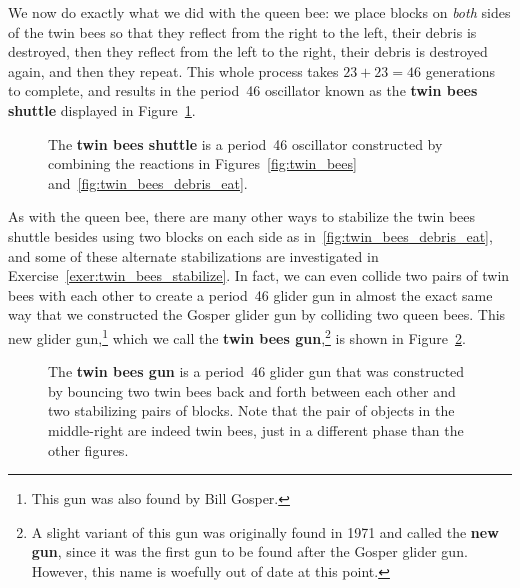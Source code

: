 We now do exactly what we did with the queen bee: we place blocks on \emph{both} sides of the twin bees so that they reflect from the right to the left, their debris is destroyed, then they reflect from the left to the right, their debris is destroyed again, and then they repeat. This whole process takes $23 + 23 = 46$ generations to complete, and results in the period~46 oscillator known as the \textbf{twin bees shuttle} displayed in Figure~\ref{fig:twin_bees_shuttle}.

\begin{figure}[!htb]
	\centering{}
	\caption{The \textbf{twin bees shuttle} is a period~46 oscillator constructed by combining the reactions in Figures~\ref{fig:twin_bees} and~\ref{fig:twin_bees_debris_eat}.}\label{fig:twin_bees_shuttle}
\end{figure}

As with the queen bee, there are many other ways to stabilize the twin bees shuttle besides using two blocks on each side as in~\ref{fig:twin_bees_debris_eat}, and some of these alternate stabilizations are investigated in Exercise~\ref{exer:twin_bees_stabilize}. In fact, we can even collide two pairs of twin bees with each other to create a period~46 glider gun in almost the exact same way that we constructed the Gosper glider gun by colliding two queen bees. This new glider gun,\footnote{This gun was also found by Bill Gosper.} which we call the \textbf{twin bees gun},\footnote{A slight variant of this gun was originally found in 1971 and called the \textbf{new gun}, since it was the first gun to be found after the Gosper glider gun. However, this name is woefully out of date at this point.} is shown in Figure~\ref{fig:twin_bees_gun}.

\begin{figure}[!htb]
	\centering{}
	\caption{The \textbf{twin bees gun} is a period~$46$ glider gun that was constructed by bouncing two twin bees back and forth between each other and two stabilizing pairs of blocks. Note that the pair of objects in the middle-right are indeed twin bees, just in a different phase than the other figures.}\label{fig:twin_bees_gun}
\end{figure}



